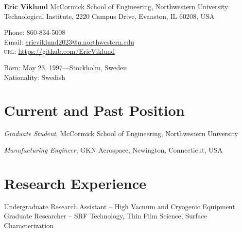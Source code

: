 \documentclass[11pt]{article} %
\begin{document}

{\LARGE\bfseries Eric Viklund} %
\bigskip\medskip %
McCormick School of Engineering,  Northwestern University\\ %
Technological Institute, 2220 Campus Drive, Evanston, IL 60208, USA
\medskip %

Phone: 860-834-5008\\ %
Email: \href{mailto:ericviklund2023@u.northwestern.edu}{ericviklund2023@u.northwestern.edu}\\ %
\textsc{url}: \href{https://github.com/EricViklund}{https://github.com/EricViklund} %

\medskip  %


Born: May 23, 1997---Stockholm, Sweden\\ %
Nationality: Swedish %


\section*{Current and Past Position}

\emph{Graduate Student}, McCormick School of Engineering,  Northwestern University %


\emph{Manufacturing Engineer}, GKN Aerospace, Newington, Connecticut, USA


\section*{Research Experience}

Undergraduate Research Assistant -- High Vacuum and Cryogenic Equipment\\
Graduate Researcher -- SRF Technology, Thin Film Science, Surface Characterization 


\end{document}
